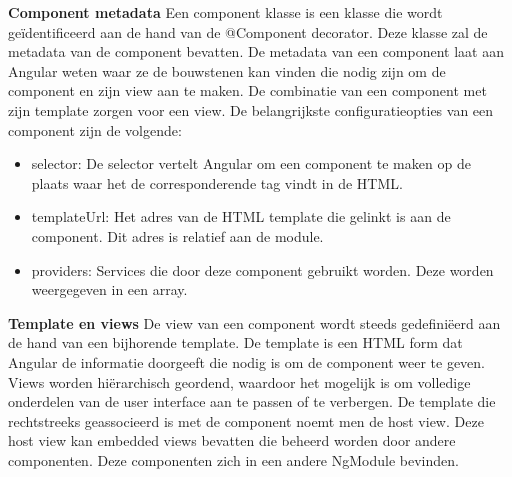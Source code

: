 \textbf{Component metadata} \hspace{1cm} Een component klasse is een klasse die wordt geïdentificeerd aan de hand van de @Component decorator. Deze klasse zal de metadata van de component bevatten. De metadata van een component laat aan Angular weten waar ze de bouwstenen kan vinden die nodig zijn om de component en zijn view aan te maken. De combinatie van een component met zijn template zorgen voor een view. 
De belangrijkste configuratieopties van een component zijn de volgende:
\begin{itemize}
	\item selector: De selector vertelt Angular om een component te maken op de plaats waar het de corresponderende tag vindt in de HTML. 
	\item templateUrl: Het adres van de HTML template die gelinkt is aan de component. Dit adres is relatief aan de module. 
	\item providers: Services die door deze component gebruikt worden. Deze worden weergegeven in een array. 
\end{itemize}

\textbf{Template en views} \hspace{1cm} De view van een component wordt steeds gedefiniëerd aan de hand van een bijhorende template. De template is een HTML form dat Angular de informatie doorgeeft die nodig is om de component weer te geven. Views worden hiërarchisch geordend, waardoor het mogelijk is om volledige onderdelen van de user interface aan te passen of te verbergen. De template die rechtstreeks geassocieerd is met de component noemt men de host view. Deze host view kan embedded views bevatten die beheerd worden door andere componenten. Deze componenten zich in een andere NgModule bevinden. 

